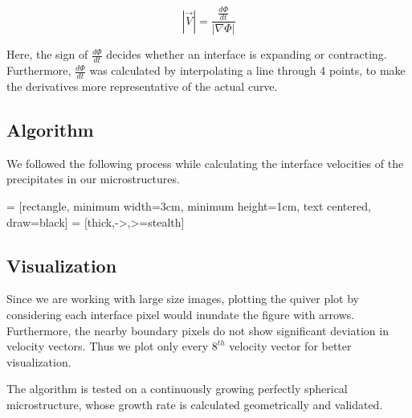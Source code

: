\documentclass[12pt, a4paper]{report}
\begin{document}
\begin{equation}
|\vec{V}| = \frac{\frac{d\Phi}{dt}}{|\nabla\Phi|}
\end{equation}


Here, the sign of $\frac{d\Phi}{dt}$ decides whether an interface is expanding or contracting. Furthermore, $\frac{d\Phi}{dt}$ was calculated by interpolating a line through 4 points, to make the derivatives more representative of the actual curve.

\subsection{Algorithm}

We followed the following process while calculating the interface velocities of the precipitates in our microstructures. 

\usetikzlibrary{shapes.geometric, arrows}

 = [rectangle, minimum width=3cm, minimum height=1cm, text centered, draw=black]
 = [thick,->,>=stealth]
\begin{center}
\end{center}


\subsection{Visualization}
Since we are working with large size images, plotting the quiver plot by considering each interface pixel would inundate the figure with arrows. Furthermore, the nearby boundary pixels do not show significant deviation in velocity vectors. Thus we plot only every $8^{th}$ velocity vector for better visualization. 

The algorithm is tested on a continuously growing perfectly spherical microstructure, whose growth rate is calculated geometrically and validated.
\end{document}

